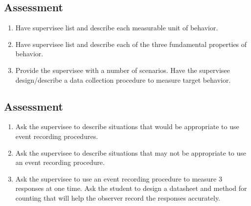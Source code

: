 \subsection{Assessment}
\begin{enumerate}
\item Have supervisee list and describe each measurable unit of behavior.
\item Have supervisee list and describe each of the three fundamental properties of behavior.
\item Provide the supervisee with a number of scenarios. Have the supervisee design/describe a data collection procedure to measure target behavior.
%
\end{enumerate}
%
\subsection{Assessment}
\begin{enumerate}
\item Ask the supervisee to describe situations that would be appropriate to use event recording procedures. 
\item Ask the supervisee to describe situations that may not be appropriate to use an event recording procedure.
\item Ask the supervisee to use an event recording procedure to measure 3 responses at one time. Ask the student to design a datasheet and method for counting that will help the observer record the responses accurately. 
\end{enumerate}
%
